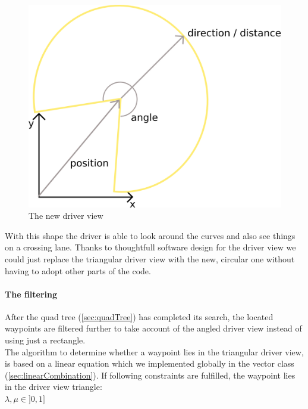 \begin{figure}[H]
\begin{center}
\includegraphics[scale=0.4]{images/driverviewcircled.png}
\end{center}
\caption{The new driver view}
\label{fig:driverViewCircled}
\end{figure}

\noindent With this shape the driver is able to look around the curves
and also see things on a crossing lane. Thanks to thoughtfull software design for the
driver view we could just replace the triangular driver view with the new,
circular one without having to adopt other parts of the code.

\paragraph{The filtering}

After the quad tree (\ref{sec:quadTree}) has completed its search, the
located waypoints are filtered further to take account of the angled
driver view instead of using just a rectangle. \\

The algorithm to determine whether a waypoint lies in the triangular
driver view, is based on a linear equation which we implemented globally
in the vector class (\ref{sec:linearCombination}). If following
constraints are fulfilled, the waypoint lies in the driver view
triangle: \\

$ \lambda, \mu \in ]0, 1]$ \\

